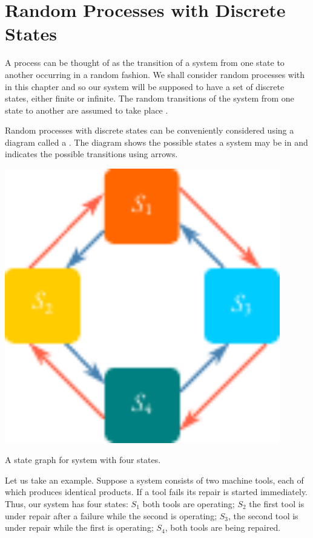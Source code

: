 \section{Random Processes with Discrete States}
A  process can be thought of as the transition of a system from
one state to another occurring in a random fashion. We shall consider
random processes with  in this chapter and so our system
will be supposed to have a set of discrete states, either finite or infinite.
The random transitions of the system from one state to another are
assumed to take place .

 Random processes with discrete states can be
conveniently considered using a diagram called a . The
diagram shows the possible states a system may be in and indicates the
possible transitions using arrows.
 \begin{marginfigure}%
 \centering
 \includegraphics[width=0.9\textwidth]{figures/state-graph1.pdf}
\caption{A state graph for system with four states.}
\label{state-graph1}
 \end{marginfigure}
 
Let us take an example. Suppose a system consists of two machine
tools, each of which produces identical products. If a tool fails its repair
is started immediately. Thus, our system has four states: $S_{1}$ both tools
are operating; $S_{2}$ the first tool is under repair after a failure while the
second is operating; $S_{3}$, the second tool is under repair while the first is
operating; $S_{4}$, both tools are being repaired.

